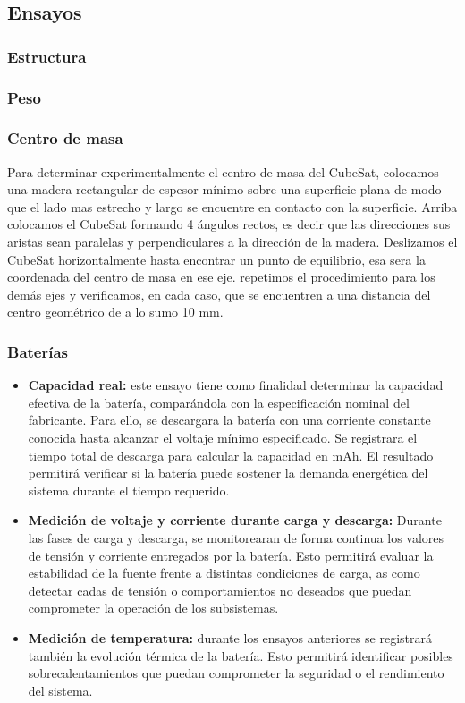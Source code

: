  \subsection{Ensayos}
    \subsubsection{Estructura}
    \subsubsection{Peso}
    \subsubsection{Centro de masa}
    Para determinar experimentalmente el centro de masa del CubeSat, colocamos una madera
    rectangular de espesor mínimo sobre una superficie plana de modo que el lado mas estrecho
    y largo se encuentre en contacto con la superficie. Arriba colocamos el CubeSat formando 4
    ángulos rectos, es decir que las direcciones sus aristas sean paralelas y perpendiculares a la
    dirección de la madera. Deslizamos el CubeSat horizontalmente hasta encontrar un punto de
    equilibrio, esa sera la coordenada del centro de masa en ese eje. repetimos el procedimiento
    para los demás ejes y verificamos, en cada caso, que se encuentren a una distancia del centro
    geométrico de a lo sumo 10 mm.

    \subsubsection{Baterías}
    \begin{itemize}
      \item \textbf{Capacidad real:} este ensayo tiene como finalidad determinar la capacidad efectiva
      de la batería, comparándola con la especificación nominal del fabricante. Para ello, se
      descargara la batería con una corriente constante conocida hasta alcanzar el voltaje
      mínimo especificado. Se registrara el tiempo total de descarga para calcular la capacidad en mAh. 
      El resultado permitirá verificar si la batería puede sostener la demanda
      energética del sistema durante el tiempo requerido.

      \item \textbf{Medición de voltaje y corriente durante carga y descarga:} Durante las fases de
      carga y descarga, se monitorearan de forma continua los valores de tensión y corriente
      entregados por la batería. Esto permitirá evaluar la estabilidad de la fuente frente a
      distintas condiciones de carga, as como detectar cadas de tensión o comportamientos
      no deseados que puedan comprometer la operación de los subsistemas.

      \item \textbf{Medición de temperatura:} durante los ensayos anteriores se registrará también la evolución térmica 
      de la batería. Esto permitirá identificar posibles sobrecalentamientos que puedan comprometer la seguridad o el 
      rendimiento del sistema.
    \end{itemize}

